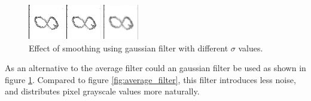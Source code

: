 \begin{figure}[H]    
	\begin{minipage}[t]{0.30\textwidth}
			\centering
			\includegraphics[width=0.4\linewidth]{Figure/mikael_8_2_dpi300_k15_sig_01.png}
			\caption{kernelsize = 15 $\sigma$ = 0.1}
			\label{fig:dpi_300_k_9_s_0.1}
	\end{minipage}
	\hspace{\fill}	
	\begin{minipage}[t]{0.30\textwidth}
		\centering
			\includegraphics[width=0.4\linewidth]{Figure/mikael_8_2_dpi300_k15_sig_04.png}
			\caption{kernelsize = 15 $\sigma$ = 0.4}
			\label{fig:dpi_300_k_9_s_0.4}
	\end{minipage}
	\hspace{\fill}
	\begin{minipage}[t]{0.30\textwidth}
		\centering
			\includegraphics[width=0.4\linewidth]{Figure/mikael_8_2_dpi300_k15_sig_07.png}
			\caption{kernelsize = 15 $\sigma$ = 0.7}
			\label{fig:fig:dpi_300_k_9_s_0.7}
	\end{minipage}
\caption{Effect of smoothing using gaussian filter with different \(\sigma\) values.}
\label{fig:gaussian_filter}
\end{figure}

As an alternative to the average filter could an gaussian filter be used as shown
 in figure \ref{fig:gaussian_filter}. 
Compared to figure \ref{fig:average_filter}, this filter introduces less noise,
and distributes pixel grayscale values more naturally.

